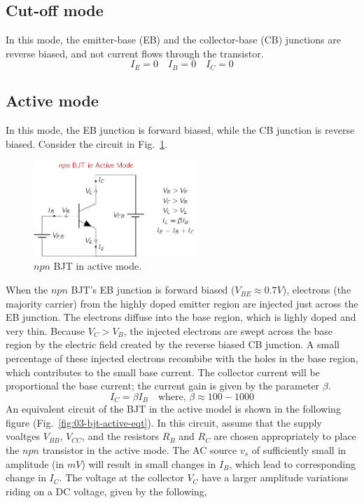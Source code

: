 \subsection{Cut-off mode}
In this mode, the emitter-base (EB) and the collector-base (CB) junctions are reverse biased, and not current flows through the transistor.
\begin{equation}
    I_E = 0 \quad I_B = 0 \quad I_C = 0
    \label{eq:03-bjt-cutoff}
\end{equation}
\subsection{Active mode}
In this mode, the EB junction is forward biased, while the CB junction is reverse biased. Consider the circuit in Fig.~\ref{fig:03-bjt-active}.
\begin{figure}[h]
    \centering
    \includegraphics[width=0.55\textwidth]{figures/ch03/fig03-bjt-active.pdf}
    \caption{$npn$ BJT in active mode.}
    \label{fig:03-bjt-active}
\end{figure}
When the $npn$ BJT's EB junction is forward biased ($V_{BE} \approx 0.7V$), electrons (the majority carrier) from the highly doped emitter region are injected just across the EB junction. The electrons diffuse into the base region, which is lighly doped and very thin. Because $V_C > V_B$, the injected electrons are swept across the base region by the electric field created by the reverse biased CB junction. A small percentage of these injected electrons recombibe with the holes in the base region, which contributes to the small base current. The collector current will be proportional the base current; the current gain is given by the parameter $\beta$.
\begin{equation}
    I_C = \beta I_B \quad \text{where, } \beta \approx 100 - 1000
    \label{eq:03-bjt-active-ic}
\end{equation}
An equivalent circuit of the BJT in the active model is shown in the following figure (Fig.~\ref{fig:03-bjt-active-eqt}). In this circuit, assume that the supply voaltges $V_{BB}$, $V_{CC}$, and the resistors $R_B$ and $R_C$ are chosen appropriately to place the $npn$ transistor in the active mode. The AC source $v_{s}$ of sufficiently small in amplitude (in $mV$) will result in small changes in $I_B$, which lead to corresponding change in $I_C$. The voltage at the collector $V_C$ have a larger amplitude variations riding on a DC voltage, given by the following,

